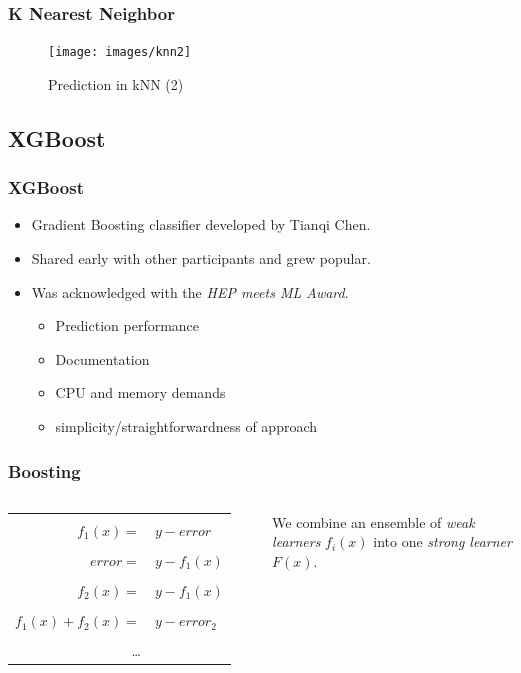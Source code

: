 \begin{frame}
	\frametitle{K Nearest Neighbor}
	\begin{figure}
	\texttt{[image: images/knn2]}
	\caption{Prediction in kNN (2)}
	\end{figure}
\end{frame}



\subsection{XGBoost}
\begin{frame}
	\frametitle{XGBoost}
	\begin{itemize}
		\item Gradient Boosting classifier developed by Tianqi Chen.
		\item Shared early with other participants and grew popular.
		\item Was acknowledged with the \emph{HEP meets ML Award}.\begin{itemize}
			\item Prediction performance
			\item Documentation
			\item CPU and memory demands
			\item simplicity/straightforwardness of approach
		\end{itemize}
	\end{itemize}
\end{frame}

\begin{frame}
	\frametitle{Boosting}
	\begin{columns}
	
	\begin{tabular}{r l}
	\\\\
		$f_1(x)  = $ & $y - error$\\\\
		$error  = $ & $y - f_1(x)$\\\\
		$f_2(x)  = $ & $y - f_1(x)$\\\\
		$f_1(x)+f_2(x)  = $ & $y - error_2$\\\\
		\ldots
	\end{tabular}
		
	\begin{block}{}
	We combine an ensemble of \emph{weak learners} $f_i(x)$ into one \emph{strong learner} $F(x)$.
	\end{block}
		
	\end{columns}
\end{frame}

